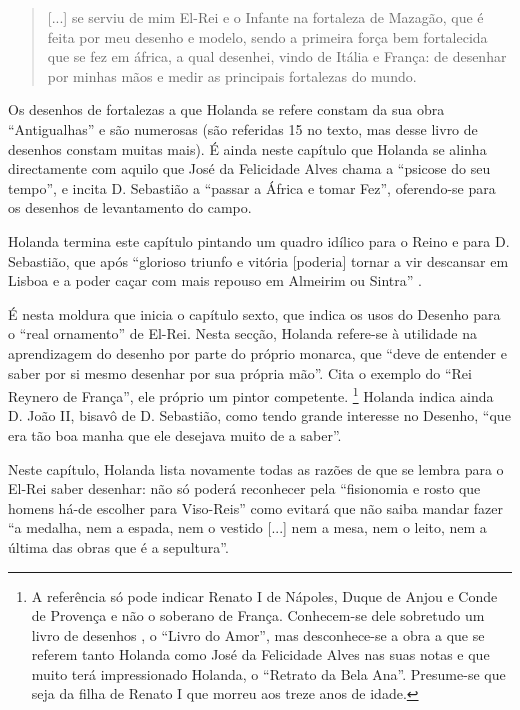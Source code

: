 \documentclass{article}
\begin{document}
\begin{quote}
  [...] se serviu de mim El-Rei e o Infante na fortaleza de Mazagão,
  que é feita por meu desenho e modelo, sendo a primeira força bem
  fortalecida que se fez em áfrica, a qual desenhei, vindo de Itália e
  França: de desenhar por minhas mãos e medir as principais fortalezas
  do mundo.
\end{quote}

Os desenhos de fortalezas a que Holanda se refere constam da sua obra
``Antigualhas'' e são numerosas (são referidas 15 no texto, mas desse
livro de desenhos constam muitas mais). É ainda neste capítulo que
Holanda se alinha directamente com aquilo que José da Felicidade Alves
chama a ``psicose do seu tempo''\cite[notas,p.54]{holanda}, e incita
D. Sebastião a ``passar a África e tomar Fez'', oferendo-se para os
desenhos de levantamento do campo.

Holanda termina este capítulo pintando um quadro idílico para o Reino
e para D. Sebastião, que após ``glorioso triunfo e vitória [poderia]
tornar a vir descansar em Lisboa e a poder caçar com mais repouso em
Almeirim ou Sintra'' \cite[fl.45v]{holanda}.

É nesta moldura que inicia o capítulo sexto, que indica os usos do
Desenho para o ``real ornamento'' de El-Rei. Nesta secção, Holanda
refere-se à utilidade na aprendizagem do desenho por parte do próprio
monarca, que ``deve de entender e saber por si mesmo desenhar por sua
própria mão''. Cita o exemplo do ``Rei Reynero de França'', ele
próprio um pintor competente. \footnote{A referência só pode indicar
  Renato I de Nápoles, Duque de Anjou e Conde de Provença e não o
  soberano de França. Conhecem-se dele sobretudo um livro de desenhos
  , o ``Livro do Amor'', mas desconhece-se a obra a que se referem
  tanto Holanda como José da Felicidade Alves nas suas notas e que
  muito terá impressionado Holanda, o ``Retrato da Bela
  Ana''. Presume-se que seja da filha de Renato I que morreu aos treze
  anos de idade.} Holanda indica ainda D. João II, bisavô de
D. Sebastião, como tendo grande interesse no Desenho, ``que era tão
boa manha que ele desejava muito de a saber''.

Neste capítulo, Holanda lista novamente todas as razões de que se
lembra para o El-Rei saber desenhar: não só poderá reconhecer pela
``fisionomia e rosto que homens há-de escolher para Viso-Reis'' como
evitará que não saiba mandar fazer ``a medalha, nem a espada, nem o
vestido [...] nem a mesa, nem o leito, nem a última das obras que é a
sepultura''.
\end{document}

